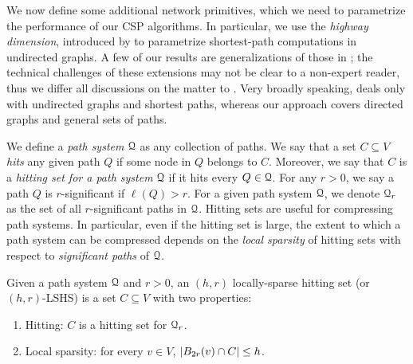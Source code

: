 We now define some additional network primitives, which we need to parametrize the performance of our CSP algorithms. 
In particular, we use the \emph{highway dimension}, introduced by \citet{highway2013,highway2010} to parametrize shortest-path computations in undirected graphs. 
A few of our results are generalizations of those in \citep{highway2013}; the technical challenges of these extensions may not be clear to a non-expert reader, thus we differ all discussions on the matter to \cite{TechReport}. 
Very broadly speaking, \cite{highway2013} deals only with undirected graphs and shortest paths, whereas our approach covers directed graphs and general sets of paths.

We define a \emph{path system} $\calQ$ as any collection of paths.
We say that a set $C\subseteq V$ \emph{hits} any given path $Q$ if some node in $Q$ belongs to $C$. Moreover, we say that $C$ is a \emph{hitting set for a path system} $\calQ$ if it hits every $Q\in\calQ$. 
For any $r>0$, we say a path $Q$ is $r$-significant if $\ell(Q)>r$. 
For a given path system $\calQ$, we denote $\calQ_r$ as the set of all $r$-significant paths in $\calQ$.
Hitting sets are useful for compressing path systems. 
In particular, even if the hitting set is large, the extent to which a path system can be compressed depends on the \emph{local sparsity} of hitting sets with respect to \emph{significant paths} of $\calQ$.

\begin{definition}\label{def:lshs}
Given a path system $\calQ$ and $r>0$, an $(h,r)$ locally-sparse hitting set (or $(h,r)$-LSHS) is a set $C\subseteq V$ with two properties: 
\begin{enumerate}[nosep]
\item Hitting: $C$ is a hitting set for $\calQ_r$.
\item Local sparsity: for every $v\in V$, $\abs*{B_{2r}(v)\cap C}\leq h$.
\end{enumerate}
\end{definition}


